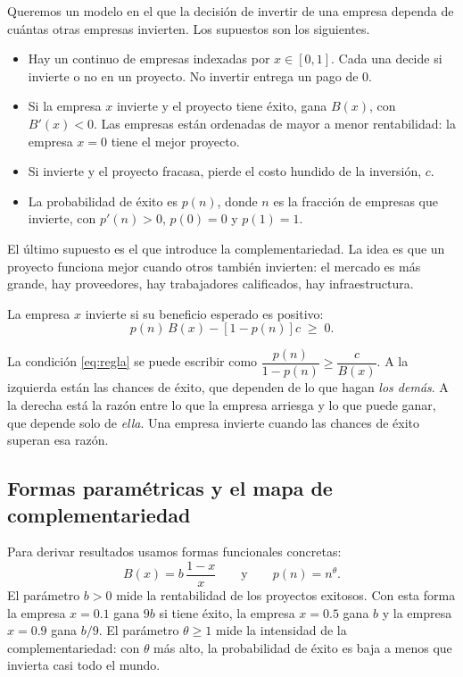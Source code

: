 \documentclass[12pt,letterpaper]{article}
\begin{document}
Queremos un modelo en el que la decisión de invertir de una empresa dependa de cuántas otras empresas invierten. Los supuestos son los siguientes.
\begin{itemize}
  \item Hay un continuo de empresas indexadas por $x\in[0,1]$. Cada una decide si invierte o no en un proyecto. No invertir entrega un pago de $0$.
  \item Si la empresa $x$ invierte y el proyecto tiene éxito, gana $B(x)$, con $B'(x)<0$. Las empresas están ordenadas de mayor a menor rentabilidad: la empresa $x=0$ tiene el mejor proyecto.
  \item Si invierte y el proyecto fracasa, pierde el costo hundido de la inversión, $c$.
  \item La probabilidad de éxito es $p(n)$, donde $n$ es la fracción de empresas que invierte, con $p'(n)>0$, $p(0)=0$ y $p(1)=1$.
\end{itemize}
El último supuesto es el que introduce la complementariedad. La idea es que un proyecto funciona mejor cuando otros también invierten: el mercado es más grande, hay proveedores, hay trabajadores calificados, hay infraestructura.

La empresa $x$ invierte si su beneficio esperado es positivo:
\begin{equation}\label{eq:regla}
  p(n)\,B(x)-\left[1-p(n)\right]c\;\geq\;0 .
\end{equation}

\begin{intuicion}
La condición \eqref{eq:regla} se puede escribir como $\dfrac{p(n)}{1-p(n)}\geq\dfrac{c}{B(x)}$. A la izquierda están las chances de éxito, que dependen de lo que hagan \emph{los demás}. A la derecha está la razón entre lo que la empresa arriesga y lo que puede ganar, que depende solo de \emph{ella}. Una empresa invierte cuando las chances de éxito superan esa razón.
\end{intuicion}

\subsection{Formas paramétricas y el mapa de complementariedad}

Para derivar resultados usamos formas funcionales concretas:
\[
  B(x)=b\,\frac{1-x}{x}\qquad\text{y}\qquad p(n)=n^{\theta}.
\]
El parámetro $b>0$ mide la rentabilidad de los proyectos exitosos. Con esta forma la empresa $x=0.1$ gana $9b$ si tiene éxito, la empresa $x=0.5$ gana $b$ y la empresa $x=0.9$ gana $b/9$. El parámetro $\theta\geq1$ mide la intensidad de la complementariedad: con $\theta$ más alto, la probabilidad de éxito es baja a menos que invierta casi todo el mundo.
\end{document}
